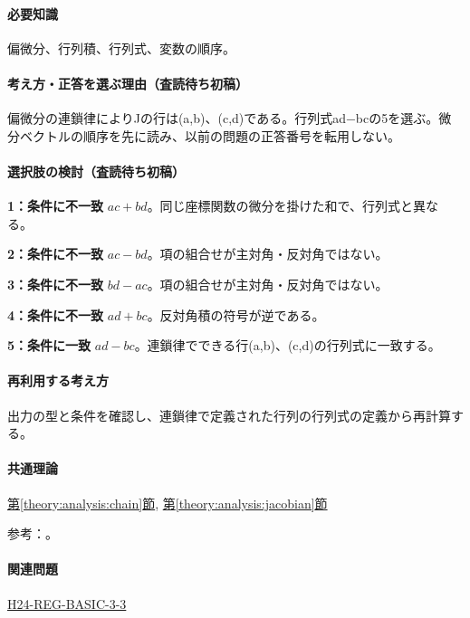 \paragraph{必要知識} 偏微分、行列積、行列式、変数の順序。

\paragraph{考え方・正答を選ぶ理由（査読待ち初稿）} 偏微分の連鎖律によりJの行は(a,b)、(c,d)である。行列式ad−bcの5を選ぶ。微分ベクトルの順序を先に読み、以前の問題の正答番号を転用しない。

\paragraph{選択肢の検討（査読待ち初稿）}\mbox{}\par

\noindent\textbf{1：条件に不一致} \(ac+bd\)。同じ座標関数の微分を掛けた和で、行列式と異なる。\par

\noindent\textbf{2：条件に不一致} \(ac-bd\)。項の組合せが主対角・反対角ではない。\par

\noindent\textbf{3：条件に不一致} \(bd-ac\)。項の組合せが主対角・反対角ではない。\par

\noindent\textbf{4：条件に不一致} \(ad+bc\)。反対角積の符号が逆である。\par

\noindent\textbf{5：条件に一致} \(ad-bc\)。連鎖律でできる行(a,b)、(c,d)の行列式に一致する。\par

\paragraph{再利用する考え方} 出力の型と条件を確認し、連鎖律で定義された行列の行列式の定義から再計算する。

\paragraph{共通理論} \hyperref[theory:analysis:chain]{第\ref*{theory:analysis:chain}節}, \hyperref[theory:analysis:jacobian]{第\ref*{theory:analysis:jacobian}節}

\par 参考：\cite{mit_chain2007}。

\paragraph{関連問題} \hyperref[q:h24-reg-basic-3-3]{H24-REG-BASIC-3-3}

